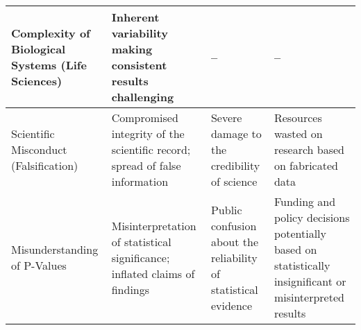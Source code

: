 \documentclass{article}
\begin{document}
\begin{table}[ht]
\begin{tabularx}{\textwidth}{|X|X|X|X|}
        \hline
        Complexity of Biological Systems (Life Sciences) & Inherent variability making consistent results challenging                      & --                                                                  & --                                                                                                      \\
        \hline
        Scientific Misconduct (Falsification)            & Compromised integrity of the scientific record; spread of false information     & Severe damage to the credibility of science                         & Resources wasted on research based on fabricated data                                                   \\
        \hline
        Misunderstanding of P-Values                     & Misinterpretation of statistical significance; inflated claims of findings      & Public confusion about the reliability of statistical evidence      & Funding and policy decisions potentially based on statistically insignificant or misinterpreted results \\
        \hline
    \end{tabularx}
\end{table}









\end{document}
